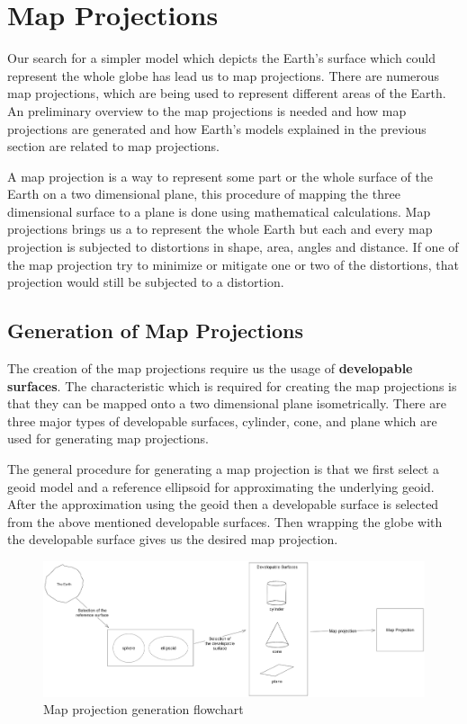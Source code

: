 

\section{Map Projections}
\label{section:map_projections}
Our search for a simpler model which depicts the Earth's surface which could represent the whole globe has lead us to map projections.
There are numerous map projections, which are being used to represent different areas of the Earth. An preliminary overview to the map projections is needed and how map projections are generated and how Earth's models explained in the previous section are related to map projections.

A map projection is a way to represent some part or the whole surface of the Earth on a two dimensional plane, this procedure of mapping the three dimensional surface to a plane is done using mathematical calculations.
Map projections brings us a to represent the whole Earth but each and every map projection is subjected to distortions in shape, area, angles and distance. If one of the map projection try to minimize or mitigate one or two of the distortions, that projection would still be subjected to a distortion.

\subsection{Generation of Map Projections}
The creation of the map projections require us the usage of \textbf{developable surfaces}. The characteristic which is required for creating the map projections is that they can be mapped onto a two dimensional plane isometrically\cite{Patrikalakis_Maekawa_2010}.
There are three major types of developable surfaces, cylinder, cone, and plane which are used for generating map projections.

The general procedure for generating a map projection is that we first select a geoid model and a reference ellipsoid for approximating the underlying geoid. After the approximation using the geoid then a developable surface is selected from the above mentioned developable surfaces.
Then wrapping the globe with the developable surface gives us the desired map projection.

\begin{figure}[H]
    \centering
    \includegraphics[width=1.0\textwidth]{figures/chapter-3/map_projection_creation.png}
    \caption{Map projection generation flowchart  }
    \label{fig:earth-image}
\end{figure}

